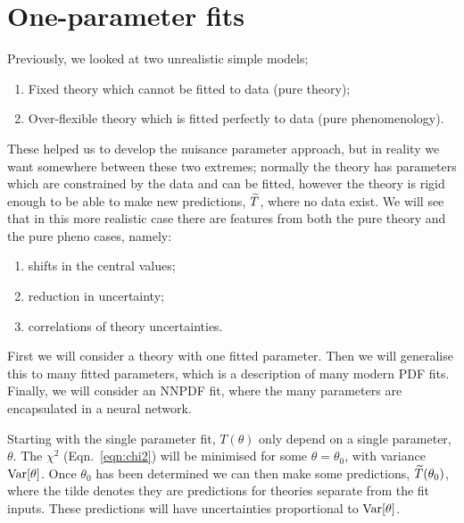 \section{One-parameter fits}
Previously, we looked at two unrealistic simple models;
\begin{enumerate}
\item Fixed theory which cannot be fitted to data (pure theory);
\item Over-flexible theory which is fitted perfectly to data (pure phenomenology).
\end{enumerate}
These helped us to develop the nuisance parameter approach, but in reality we want somewhere between these two extremes; normally the theory has parameters which are constrained by the data and can be fitted, however the theory is rigid enough to be able to make new predictions, $\widetilde{T}$, where no data exist. We will see that in this more realistic case there are features from both the pure theory and the pure pheno cases, namely:
\begin{enumerate}
\item shifts in the central values;
\item reduction in uncertainty;
\item correlations of theory uncertainties.
\end{enumerate}
First we will consider a theory with one fitted parameter. Then we will generalise this to many fitted parameters, which is a description of many modern PDF fits. Finally, we will consider an NNPDF fit, where the many parameters are encapsulated in a neural network. 

Starting with the single parameter fit, $T(\theta)$ only depend on a single parameter, $\theta$. The $\chi^2$ (Eqn.~\ref{eqn:chi2}) will be minimised for some $\theta = \theta_0$, with variance ${\rm Var} [\theta]$. Once $\theta_0$ has been determined we can then make some predictions, $\widetilde{T}(\theta_0)$, where the tilde denotes they are predictions for theories separate from the fit inputs. These predictions will have uncertainties proportional to ${\rm Var} [\theta]$. 

